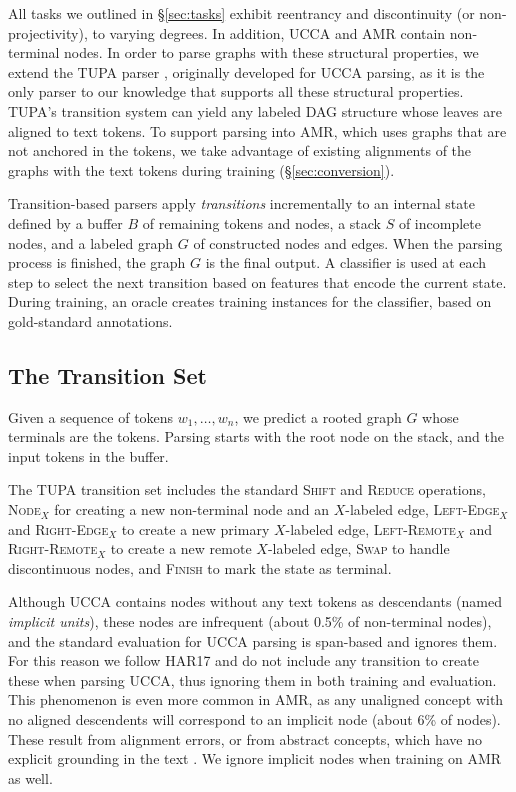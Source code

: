 \documentclass[11pt,a4paper]{article}
\begin{document}
All tasks we outlined in \S\ref{sec:tasks} exhibit
reentrancy and discontinuity (or non-projectivity), to varying degrees.
In addition, UCCA and AMR contain non-terminal nodes.
In order to parse graphs with these structural properties,
we extend the TUPA parser \cite[][henceforth HAR17]{hershcovich2017a}, 
originally developed for UCCA parsing,
as it is the only parser to our knowledge that supports 
all these structural properties.
TUPA's transition system can yield any labeled DAG structure
whose leaves are aligned to text tokens.
To support parsing into AMR, which uses graphs that are not anchored in the tokens,
 we take advantage of existing alignments of the graphs with the text
tokens during training (\S\ref{sec:conversion}).

Transition-based parsers \cite{Nivre03anefficient} apply \textit{transitions}
incrementally to an internal state defined by a buffer $B$ of remaining tokens 
and nodes, a stack $S$ of incomplete nodes, and a labeled graph $G$ of 
constructed nodes and edges.
When the parsing process is finished, the graph $G$ is the final output.
A classifier is used at each step to select the next transition based on features
that encode the current state.
During training, an oracle creates training instances for the classifier,
based on gold-standard annotations.


\subsection{The Transition Set}\label{sec:transition_set}

Given a sequence of tokens $w_1, \ldots, w_n$,
we predict a rooted graph $G$ whose terminals are the tokens.
Parsing starts with the root node on the stack,
and the input tokens in the buffer.

The TUPA transition set includes
the standard \textsc{Shift} and \textsc{Reduce} operations,
\textsc{Node$_X$} for creating a new non-terminal node and an $X$-labeled edge,
\textsc{Left-Edge$_X$} and \textsc{Right-Edge$_X$} to create a new primary $X$-labeled edge,
\textsc{Left-Remote$_X$} and \textsc{Right-Remote$_X$} to create a new remote $X$-labeled edge,
\textsc{Swap} to handle discontinuous nodes,
and \textsc{Finish} to mark the state as terminal.

Although UCCA contains nodes without any text tokens as descendants
(named \textit{implicit units}),
these nodes are infrequent (about 0.5\% of non-terminal nodes), and
the standard evaluation for UCCA parsing is span-based and ignores them.
For this reason we follow HAR17 and do not include
any transition to create these when parsing UCCA,
thus ignoring them in both training and evaluation.
This phenomenon is even more common in AMR, as any unaligned concept
with no aligned descendents
will correspond to an implicit node (about 6\% of nodes).
These result from alignment errors, or from abstract concepts,
which have no explicit grounding in the text \cite{buys2017oxford}.
We ignore implicit nodes when training on AMR as well.
\end{document}
